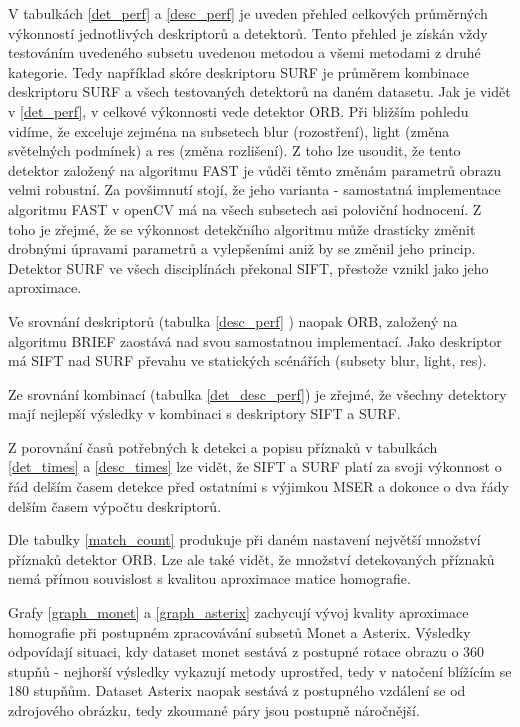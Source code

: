 V tabulkách \ref{det_perf} a \ref{desc_perf} je uveden přehled celkových průměrných výkonností jednotlivých deskriptorů
a detektorů. Tento přehled je získán vždy testováním uvedeného subsetu uvedenou metodou a všemi
metodami z druhé kategorie. Tedy například skóre deskriptoru SURF je průměrem kombinace
deskriptoru SURF a všech testovaných detektorů na daném datasetu.
Jak je vidět v \ref{det_perf}, v celkové výkonnosti vede detektor ORB. Při bližším pohledu vidíme, že exceluje
zejména na subsetech blur (rozostření), light (změna světelných podmínek) a res (změna rozlišení).
Z toho lze usoudit, že tento detektor založený na algoritmu FAST je vůdči těmto změnám parametrů obrazu
velmi robustní. Za povšimnutí stojí, že jeho varianta - samostatná implementace algoritmu FAST 
v openCV má na všech subsetech asi poloviční hodnocení. Z toho je zřejmé, že se výkonnost detekčního
algoritmu může drasticky změnit drobnými úpravami parametrů a vylepšeními aniž by se změnil jeho princip.
Detektor SURF ve všech disciplínách překonal SIFT, přestože vznikl jako jeho aproximace.

Ve srovnání deskriptorů (tabulka \ref{desc_perf} ) naopak ORB, založený na algoritmu BRIEF zaostává nad svou samostatnou implementací.
Jako deskriptor má SIFT nad SURF převahu ve statických scénářích (subsety blur, light, res).

Ze srovnání kombinací (tabulka \ref{det_desc_perf}) je zřejmé, že všechny detektory mají nejlepší výsledky v kombinaci s deskriptory
SIFT a SURF.

Z porovnání časů potřebných k detekci a popisu příznaků v tabulkách \ref{det_times} a \ref{desc_times} lze vidět, že SIFT a SURF platí za svoji
výkonnost o řád delším časem detekce před ostatními s výjimkou MSER a dokonce o dva řády delším časem výpočtu deskriptorů.

Dle tabulky \ref{match_count} produkuje při daném nastavení největší množství příznaků detektor ORB. Lze ale také vidět, že množství
detekovaných příznaků nemá přímou souvislost s kvalitou aproximace matice homografie.

Grafy \ref{graph_monet} a \ref{graph_asterix} zachycují vývoj kvality aproximace homografie při postupném zpracovávání subsetů Monet a Asterix.
Výsledky odpovídají situaci, kdy dataset monet sestává z postupné rotace obrazu o 360 stupňů - nejhorší výsledky vykazují metody uprostřed, tedy
v natočení blížícím se 180 stupňům. Dataset Asterix naopak sestává z postupného vzdálení se od zdrojového obrázku, tedy zkoumané páry jsou postupně
náročnější.

